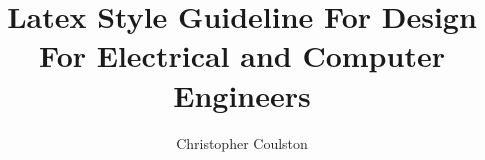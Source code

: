 \documentclass[letterpaper, 10pt]{memoir}
\begin{document}
\frontmatter
\title{Latex Style Guideline For Design For Electrical and Computer Engineers} 
\author{Christopher Coulston}
\date{}

\maketitle

\tableofcontents

\mainmatter 




\printindex
\end{document}
